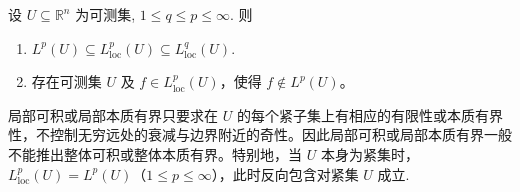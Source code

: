 \documentclass[../../main.tex]{subfiles}
\begin{document}
\begin{proposition}[整体可积与局部可积的关系]\label{proposition:整体可积与局部可积的关系}
设 $U\subseteq\mathbb{R}^n$ 为可测集, $1\leqslant q\leqslant p\leqslant\infty$. 则
\begin{enumerate}[(1)]
\item\label{proposition:整体可积与局部可积的关系-1} \(L^p(U)\subseteq L^p_{\mathrm{loc}}(U)
\subseteq L^q_{\mathrm{loc}}(U)\).

\item 存在可测集 \(U\) 及 \(f\in L^p_{\mathrm{loc}}(U)\)，使得 \(f\notin L^p(U)\)。
\end{enumerate}
\end{proposition}
\begin{remark}
局部可积或局部本质有界只要求在 \(U\) 的每个紧子集上有相应的有限性或本质有界性，不控制无穷远处的衰减与边界附近的奇性。因此局部可积或局部本质有界一般不能推出整体可积或整体本质有界。特别地，当 \(U\) 本身为紧集时，\(L^p_{\mathrm{loc}}(U)=L^p(U)\)（\(1\leqslant p\leqslant\infty\)），此时反向包含对紧集 \(U\) 成立.
\end{remark}
\end{document}
